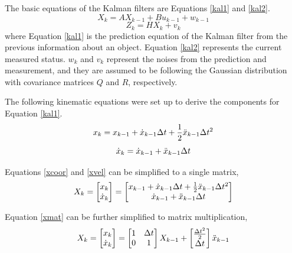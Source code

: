 The basic equations of the Kalman filters are Equations \ref{kal1} and \ref{kal2}. 
\begin{equation} \label{kal1}
    X_k = AX_{k-1} + Bu_{k-1}+w_{k-1}
\end{equation}
\begin{equation} \label{kal2}
    Z_k = HX_k + v_k
\end{equation}
where Equation \ref{kal1} is the prediction equation of the Kalman filter from the previous information about an object. Equation \ref{kal2} represents the current measured status. \(w_k\) and \(v_k\) represent the noises from the prediction and measurement, and they are assumed to be following the Gaussian distribution with covariance matrices \(Q\) and \(R\), respectively.

The following kinematic equations were set up to derive the components for Equation \ref{kal1}.
\begin{equation} \label{xcoor}
x_k=x_{k-1}+\Dot{x}_{k-1}\Delta t + \frac{1}{2}\Ddot{x}_{k-1}\Delta t ^2
\end{equation}
\begin{equation} \label{xvel}
\Dot{x}_k=\Dot{x}_{k-1}+\Ddot{x}_{k-1}\Delta t
\end{equation}

Equations \ref{xcoor} and \ref{xvel} can be simplified to a single matrix, 
\begin{equation} \label{xmat}
X_k = \begin{bmatrix} x_k \\ \Dot{x}_k\end{bmatrix}=\begin{bmatrix}
    x_{k-1}+\Dot{x}_{k-1}\Delta t + \frac{1}{2}\Ddot{x}_{k-1}\Delta t ^2 \\
    \Dot{x}_{k-1}+\Ddot{x}_{k-1}\Delta t
\end{bmatrix}
\end{equation}

Equation \ref{xmat} can be further simplified to matrix multiplication,
\begin{equation} \label{xmatsimp}
X_k = \begin{bmatrix} x_k \\ \Dot{x}_k\end{bmatrix} = \begin{bmatrix}
    1 & \Delta t \\
    0 & 1
\end{bmatrix}
X_{k-1}
+
\begin{bmatrix}
    \frac{\Delta t^2}{2} \\
    \Delta t
\end{bmatrix}
\Ddot{x}_{k-1}
\end{equation}

